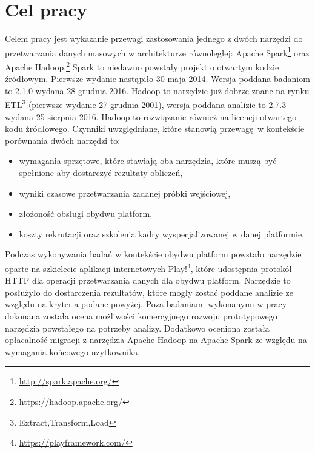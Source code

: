 \section{Cel pracy}
Celem pracy jest wykazanie przewagi zastosowania jednego z dwóch narzędzi do przetwarzania danych masowych w architekturze równoległej: Apache Spark\footnote{\url{http://spark.apache.org/}} oraz Apache Hadoop.\footnote{\url{https://hadoop.apache.org/}} Spark to niedawno powstały projekt o otwartym kodzie źródłowym. Pierwsze wydanie nastąpiło 30 maja 2014. Wersja poddana badaniom to 2.1.0 wydana 28 grudnia 2016. Hadoop to narzędzie już dobrze znane na rynku ETL\footnote{Extract,Transform,Load} (pierwsze wydanie 27 grudnia 2001), wersja poddana analizie to 2.7.3 wydana 25 sierpnia 2016. Hadoop to rozwiązanie również na licencji otwartego kodu źródłowego. Czynniki uwzględniane, które stanowią przewagę w kontekście porównania dwóch narzędzi to:
\begin{itemize}
	\item wymagania sprzętowe, które stawiają oba narzędzia, które muszą być spełnione aby dostarczyć rezultaty obliczeń,
	\item wyniki czasowe przetwarzania zadanej próbki wejściowej,
	\item złożoność obsługi obydwu platform,
	\item koszty rekrutacji oraz szkolenia kadry wyspecjalizowanej w danej platformie.
\end{itemize}
Podczas wykonywania badań w kontekście obydwu platform powstało narzędzie oparte na szkielecie aplikacji internetowych Play!\footnote{\url{https://playframework.com/}}, które udostępnia protokół HTTP dla operacji przetwarzania danych dla obydwu platform. Narzędzie to posłużyło do dostarczenia rezultatów, które mogły zostać poddane analizie ze względu na kryteria podane powyżej. Poza badaniami wykonanymi w pracy dokonana została ocena możliwości komercyjnego rozwoju prototypowego narzędzia powstałego na potrzeby analizy. Dodatkowo oceniona została opłacalność migracji z narzędzia Apache Hadoop na Apache Spark ze względu na wymagania końcowego użytkownika.
